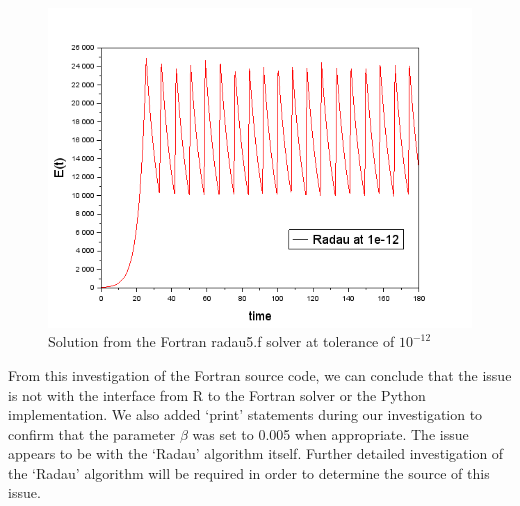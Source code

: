 \begin{figure}[h]
\centering
\includegraphics[width=0.7\linewidth]{./figures/fortran_radau_tol_12}
\caption{Solution from the Fortran radau5.f solver at tolerance of $10^{-12}$}
\label{fig:fortran_radau_tol_12}
\end{figure}

From this investigation of the Fortran source code, we can conclude that the issue is not with the interface from R to the Fortran solver or the Python implementation. We also added `print' statements during our investigation to confirm that the parameter $\beta$ was set to 0.005 when appropriate. The issue appears to be with the `Radau' algorithm itself. Further detailed investigation of the `Radau' algorithm will be required in order to determine the source of this issue.
